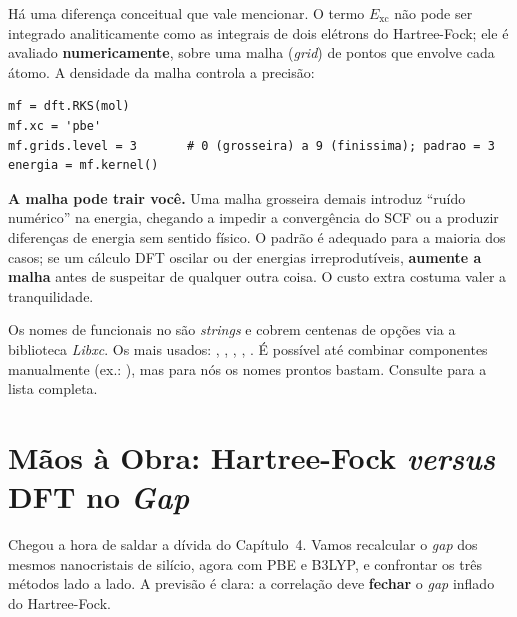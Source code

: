 Há uma diferença conceitual que vale mencionar. O termo $E_{\text{xc}}$ não pode ser
integrado analiticamente como as integrais de dois elétrons do Hartree-Fock; ele é
avaliado \textbf{numericamente}, sobre uma malha (\emph{grid}) de pontos que envolve
cada átomo. A densidade da malha controla a precisão:

\begin{lstlisting}[style=python,caption={Ajustando a malha de integração.},label={lst:grid}]
mf = dft.RKS(mol)
mf.xc = 'pbe'
mf.grids.level = 3       # 0 (grosseira) a 9 (finissima); padrao = 3
energia = mf.kernel()
\end{lstlisting}

\begin{caixaatencao}
\textbf{A malha pode trair você.} Uma malha grosseira demais introduz ``ruído
numérico'' na energia, chegando a impedir a convergência do SCF ou a produzir
diferenças de energia sem sentido físico. O padrão  é
adequado para a maioria dos casos; se um cálculo DFT oscilar ou der energias
irreprodutíveis, \textbf{aumente a malha} antes de suspeitar de qualquer outra
coisa. O custo extra costuma valer a tranquilidade.
\end{caixaatencao}

\begin{caixadica}
Os nomes de funcionais no \pyscf{} são \emph{strings} e cobrem centenas de opções
via a biblioteca \emph{Libxc}. Os mais usados: , ,
, , . É possível até combinar componentes
manualmente (ex.: ), mas para nós os nomes
prontos bastam. Consulte  para a lista completa.
\end{caixadica}

\section{Mãos à Obra: Hartree-Fock \emph{versus} DFT no \emph{Gap}}
\label{sec:maos5}

Chegou a hora de saldar a dívida do Capítulo~4. Vamos recalcular o \emph{gap} dos
mesmos nanocristais de silício, agora com PBE e B3LYP, e confrontar os três métodos
lado a lado. A previsão é clara: a correlação deve \textbf{fechar} o \emph{gap}
inflado do Hartree-Fock.

